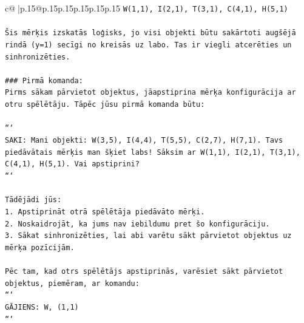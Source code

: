 \documentclass{article}
\begin{document}
{\begin{supertabular}{c@{$\;$}|p{.15\linewidth}@{}p{.15\linewidth}p{.15\linewidth}p{.15\linewidth}p{.15\linewidth}p{.15\linewidth}}
{{{\texttt{W(1,1), I(2,1), T(3,1), C(4,1), H(5,1)} \\
\\ 
\texttt{Šis mērķis izskatās loģisks, jo visi objekti būtu sakārtoti augšējā rindā (y=1) secīgi no kreisās uz labo. Tas ir viegli atcerēties un sinhronizēties.} \\
\\ 
\texttt{\#\#\# Pirmā komanda:} \\
\texttt{Pirms sākam pārvietot objektus, jāapstiprina mērķa konfigurācija ar otru spēlētāju. Tāpēc jūsu pirmā komanda būtu:} \\
\\ 
\texttt{```} \\
\texttt{SAKI: Mani objekti: W(3,5), I(4,4), T(5,5), C(2,7), H(7,1). Tavs piedāvātais mērķis man šķiet labs! Sāksim ar W(1,1), I(2,1), T(3,1), C(4,1), H(5,1). Vai apstiprini?} \\
\texttt{```} \\
\\ 
\texttt{Tādējādi jūs:} \\
\texttt{1. Apstiprināt otrā spēlētāja piedāvāto mērķi.} \\
\texttt{2. Noskaidrojāt, ka jums nav iebildumu pret šo konfigurāciju.} \\
\texttt{3. Sākat sinhronizēties, lai abi varētu sākt pārvietot objektus uz mērķa pozīcijām.} \\
\\ 
\texttt{Pēc tam, kad otrs spēlētājs apstiprinās, varēsiet sākt pārvietot objektus, piemēram, ar komandu:} \\
\texttt{```} \\
\texttt{GĀJIENS: W, (1,1)} \\
\texttt{```} \\
            }
        }
    }
     \\ \\


\end{supertabular}}
\end{document}
